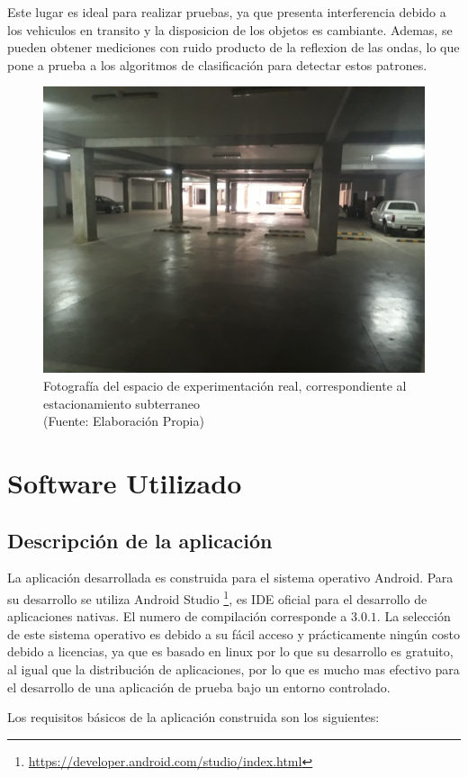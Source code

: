 Este lugar es ideal para realizar pruebas, ya que presenta interferencia debido a los vehiculos en transito y la disposicion de los objetos es cambiante. Ademas, se pueden obtener mediciones con ruido producto de la reflexion de las ondas, lo que pone a prueba a los algoritmos de clasificación para detectar estos patrones. 

\begin{figure}[ht!]
\centering
\includegraphics[width=.6\textwidth]{figures/estReal.jpg}
\caption[abs]{Fotografía del espacio de experimentación real, correspondiente al estacionamiento subterraneo\\
{\scriptsize (Fuente: Elaboración Propia)}}
\label{fig:estReal}
\end{figure}


\section{Software Utilizado}

\subsection{Descripción de la aplicación}

La aplicación desarrollada es construida para el sistema operativo Android. Para su desarrollo se utiliza Android Studio \footnote{\url{https://developer.android.com/studio/index.html}}, es IDE oficial para el desarrollo de aplicaciones nativas. El numero de compilación corresponde a $3.0.1$. La selección de este sistema operativo es debido a su fácil acceso y prácticamente ningún costo debido a licencias, ya que es basado en linux por lo que su desarrollo es gratuito, al igual que la distribución de aplicaciones, por lo que es mucho mas efectivo para el desarrollo de una aplicación de prueba bajo un entorno controlado.

Los requisitos básicos de la aplicación construida son los siguientes:

